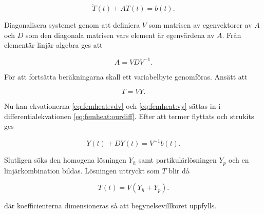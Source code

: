 \begin{equation}
\label{eq:femheat:ourdiff}
\dot{T}(t) + AT(t) = b(t).
\end{equation}

Diagonalisera systemet genom att definiera $V$ som matrisen av egenvektorer av $A$ och $D$ som den
diagonala matrisen vars element är egenvärdena av $A$. Från elementär linjär algebra\cite{lay06} ges att

\begin{equation}
\label{eq:femheat:vdv}
A = VDV^{-1}.
\end{equation}

För att fortsätta beräkningarna skall ett variabelbyte genomföras. Ansätt att

\begin{equation}
\label{eq:femheat:vy}
T = VY.
\end{equation}

Nu kan ekvationerna \eqref{eq:femheat:vdv} och \eqref{eq:femheat:vy} sättas in i differentialekvationen
\eqref{eq:femheat:ourdiff}. Efter att termer flyttats och strukits ges

\begin{equation}
\dot{Y}(t) + DY(t) = V^{-1}b(t).
\end{equation}

Slutligen söks den homogena lösningen $Y_h$ samt partikulärlösningen $Y_p$ och en linjärkombination bildas.
Lösningen uttryckt som $T$ blir då

\begin{equation}
\label{eq:femheat:solution}
T(t) = V(Y_h+Y_p).
\end{equation}

där koefficienterna dimensioneras så att begynelsevillkoret uppfylls.
